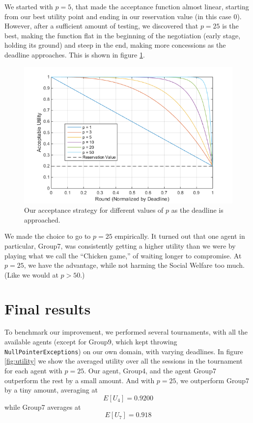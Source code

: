 \documentclass[a4,11pt]{scrartcl}
\begin{document}
We started with $p=5$, that made the acceptance function almost linear, starting from our best utility point and ending in our reservation value (in this case 0). However, after a sufficient amount of testing, we discovered that $p=25$ is the best, making the function flat in the beginning of the negotiation (early stage, holding its ground) and steep in the end, making more concessions as the deadline approaches. This is shown in figure \ref{fig:chicken}.
\label{sec:improvements}
\begin{figure}[ht]
    \centering
    \includegraphics[width=\textwidth]{chicken.png}
    \caption{Our acceptance strategy for different values of $p$ as the deadline is approached.}
    \label{fig:chicken}
\end{figure}

We made the choice to go to $p=25$ empirically. It turned out that one agent in particular, Group7, was consistently getting a higher utility than we were by playing what we call the ``Chicken game,'' of waiting longer to compromise. At $p=25$, we have the advantage, while not harming the Social Welfare too much. (Like we would at $p>50$.)


\section{Final results}

To benchmark our improvement, we performed several tournaments, with all 
the available agents (except for Group9, which kept throwing 
\verb|NullPointerExceptions|) on our own domain, 
with 
varying deadlines. In figure \ref{fig:utility} we show the averaged utility over all the sessions in the tournament for each agent with $p=25$. Our agent, Group4, and the agent Group7 outperform the rest by a small amount. And with $p=25$, we outperform Group7 by a tiny amount, averaging at $$E[U_{4}]=0.9200$$ while Group7 averages at $$E[U_{7}]=0.918$$
\end{document}
